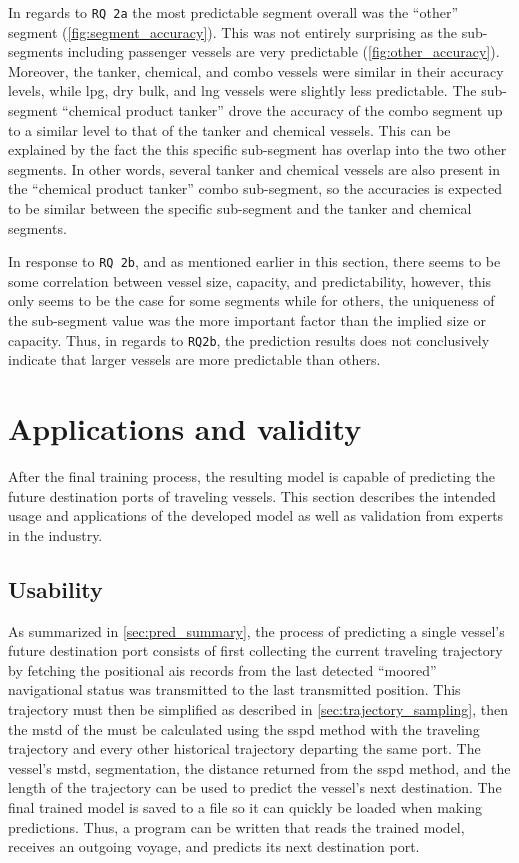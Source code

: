 In regards to \texttt{RQ 2a} the most predictable segment overall was the ``other'' segment (\cref{fig:segment_accuracy}). This was not entirely surprising as the sub-segments including passenger vessels are very predictable (\cref{fig:other_accuracy}). Moreover, the tanker, chemical, and combo vessels were similar in their accuracy levels, while \acrshort{lpg}, dry bulk, and \acrshort{lng} vessels were slightly less predictable. The sub-segment ``chemical product tanker'' drove the accuracy of the combo segment up to a similar level to that of the tanker and chemical vessels. This can be explained by the fact the this specific sub-segment has overlap into the two other segments. In other words, several tanker and chemical vessels are also present in the ``chemical product tanker'' combo sub-segment, so the accuracies is expected to be similar between the specific sub-segment and the tanker and chemical segments.

In response to \texttt{RQ 2b}, and as mentioned earlier in this section, there seems to be some correlation between vessel size, capacity, and predictability, however, this only seems to be the case for some segments while for others, the uniqueness of the sub-segment value was the more important factor than the implied size or capacity. Thus, in regards to \texttt{RQ2b}, the prediction results does not conclusively indicate that larger vessels are more predictable than others.


\section{Applications and validity}

After the final training process, the resulting model is capable of predicting the future destination ports of traveling vessels. This section describes the intended usage and applications of the developed model as well as validation from experts in the industry.

\subsection{Usability}
\label{sec:usability}

As summarized in \cref{sec:pred_summary}, the process of predicting a single vessel's future destination port consists of first collecting the current traveling trajectory by fetching the positional \acrshort{ais} records from the last detected ``moored'' navigational status was transmitted to the last transmitted position. This trajectory must then be simplified as described in \cref{sec:trajectory_sampling}, then the \acrfull{mstd} of the must be calculated using the \acrshort{sspd} method with the traveling trajectory and every other historical trajectory departing the same port. The vessel's \acrshort{mstd}, segmentation, the distance returned from the \acrshort{sspd} method, and the length of the trajectory can be used to predict the vessel's next destination. The final trained model is saved to a file so it can quickly be loaded when making predictions. Thus, a program can be written that reads the trained model, receives an outgoing voyage, and predicts its next destination port.

